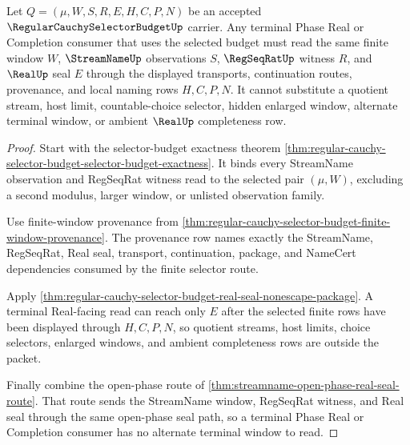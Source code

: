 \begin{theorem}
\label{thm:regular-cauchy-selector-budget-terminal-window-lock}
Let $Q=(\mu,W,S,R,E,H,C,P,N)$ be an accepted $\RegularCauchySelectorBudgetUp$ carrier. Any terminal Phase Real or Completion consumer that uses the selected budget must read the same finite window $W$, $\StreamNameUp$ observations $S$, $\RegSeqRatUp$ witness $R$, and $\RealUp$ seal $E$ through the displayed transports, continuation routes, provenance, and local naming rows $H,C,P,N$. It cannot substitute a quotient stream, host limit, countable-choice selector, hidden enlarged window, alternate terminal window, or ambient $\RealUp$ completeness row.
\end{theorem}
\begin{proof}
Start with the selector-budget exactness theorem \autoref{thm:regular-cauchy-selector-budget-selector-budget-exactness}. It binds every StreamName observation and RegSeqRat witness read to the selected pair $(\mu,W)$, excluding a second modulus, larger window, or unlisted observation family.

Use finite-window provenance from \autoref{thm:regular-cauchy-selector-budget-finite-window-provenance}. The provenance row names exactly the StreamName, RegSeqRat, Real seal, transport, continuation, package, and NameCert dependencies consumed by the finite selector route.

Apply \autoref{thm:regular-cauchy-selector-budget-real-seal-nonescape-package}. A terminal Real-facing read can reach only $E$ after the selected finite rows have been displayed through $H,C,P,N$, so quotient streams, host limits, choice selectors, enlarged windows, and ambient completeness rows are outside the packet.

Finally combine the open-phase route of \autoref{thm:streamname-open-phase-real-seal-route}. That route sends the StreamName window, RegSeqRat witness, and Real seal through the same open-phase seal path, so a terminal Phase Real or Completion consumer has no alternate terminal window to read.
\end{proof}

